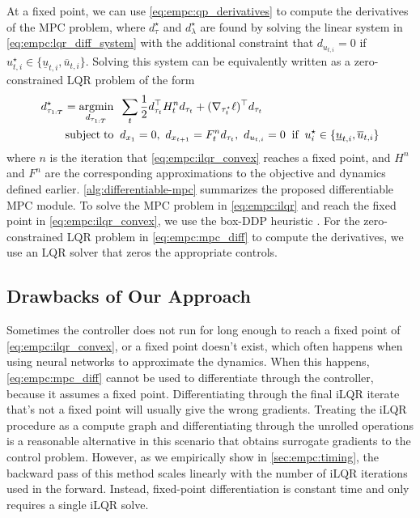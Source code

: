 At a fixed point, we can use
\cref{eq:empc:qp_derivatives} to compute the derivatives of the MPC problem,
where $d_\tau^\star$ and $d_\lambda^\star$ are found by
solving the linear system in
\cref{eq:empc:lqr_diff_system}
with the additional constraint that
$d_{u_{t,i}}=0$ if $u_{t,i}^\star\in\{\underline{u}_{t,i}, \overline{u}_{t,i}\}$.
Solving this system can be equivalently written as a
zero-constrained LQR problem of the form
\begin{align}
  \label{eq:empc:mpc_diff}
  \begin{split}
    d_{\tau_{1:T}}^{\star} = \operatorname*{argmin}_{d_{\tau_{1:T}}} \;\; &
    \sum_{t} \frac{1}{2} d_{\tau_t}^\top  H_t^n d_{\tau_t} +
      (\nabla_{\tau_t^\star} \ell)^\top  d_{\tau_t} \\
    \operatorname*{subject\;to}\;\;
    & d_{x_1} = 0,\
    d_{x_{t+1}} = F_t^n d_{\tau_t},\
    d_{u_{t,i}} = 0\;\; \text{if}\;\; u_i^\star
      \in\{\underline{u}_{t,i}, \overline{u}_{t,i}\} \\
  \end{split}
\end{align}
where $n$ is the iteration that \cref{eq:empc:ilqr_convex}
reaches a fixed point, and $H^n$ and $F^n$ are the
corresponding approximations to the objective and
dynamics defined earlier.
\cref{alg:differentiable-mpc} summarizes the proposed
differentiable MPC module.
To solve the MPC problem in \cref{eq:empc:ilqr} and reach the fixed point in
\cref{eq:empc:ilqr_convex}, we use the box-DDP heuristic \citep{tassa2014control}.
For the zero-constrained LQR problem in \cref{eq:empc:mpc_diff}
to compute the derivatives, we use an LQR solver that zeros
the appropriate controls.

\subsection{Drawbacks of Our Approach}
Sometimes the controller does not run for long enough to reach a
fixed point of \cref{eq:empc:ilqr_convex}, or a fixed
point doesn't exist, which often happens when
using neural networks to approximate the dynamics.
When this happens, \cref{eq:empc:mpc_diff} cannot be used to differentiate
through the controller, because it assumes a fixed point.
Differentiating through the final iLQR
iterate that's not a fixed point will usually
give the wrong gradients.
Treating the iLQR procedure as a compute graph and differentiating through
the unrolled operations is a reasonable alternative in this scenario that
obtains surrogate gradients to the control problem.
However, as we empirically show
in \cref{sec:empc:timing},
the backward pass of this method
scales linearly with the
number of iLQR iterations used in the forward.
Instead, fixed-point differentiation is constant time
and only requires a single iLQR solve.

